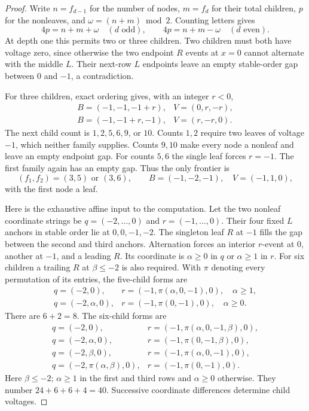 \documentclass[11pt,letterpaper]{article}
\theoremstyle{plain}
\theoremstyle{definition}
\begin{document}
\begin{NoHyper}
\begin{proof}
Write $n=f_{d-1}$ for the number of nodes, $m=f_d$ for their total children,
$p$ for the nonleaves, and $\omega=(n+m)\bmod2$. Counting letters gives
\begin{equation}\label{eq:treecount}
4p=n+m+\omega\quad(d\text{ odd}),\qquad
4p=n+m-\omega\quad(d\text{ even}).
\end{equation}
At depth one this permits two or three children. Two children must both
have voltage zero, since otherwise the two endpoint $R$ events at $x=0$
cannot alternate with the middle $L$. Their next-row $L$ endpoints leave
an empty stable-order gap between $0$ and $-1$, a contradiction.

For three children, exact ordering gives, with an integer $r<0$,
\[
\begin{array}{ll}
 B=(-1,-1,-1+r),&V=(0,r,-r),\\
 B=(-1,-1+r,-1),&V=(r,-r,0).
\end{array}
\]
The next child count is $1,2,5,6,9$, or $10$. Counts $1,2$ require two
leaves of voltage $-1$, which neither family supplies. Counts $9,10$
make every node a nonleaf and leave an empty endpoint gap. For counts
$5,6$ the single leaf forces $r=-1$. The first family again has an empty
gap. Thus the only frontier is
\[
(f_1,f_2)=(3,5)\text{ or }(3,6),\qquad
B=(-1,-2,-1),\quad V=(-1,1,0),
\]
with the first node a leaf.

Here is the exhaustive affine input to the computation. Let the two
nonleaf coordinate strings be $q=(-2,\ldots,0)$ and $r=(-1,\ldots,0)$.
Their four fixed $L$ anchors in stable order lie at $0,0,-1,-2$.
The singleton leaf $R$ at $-1$ fills the gap between the second and third
anchors. Alternation forces an interior $r$-event at $0$, another at
$-1$, and a leading $R$. Its coordinate is $\alpha\ge0$ in $q$ or
$\alpha\ge1$ in $r$. For six children a trailing $R$ at $\beta\le-2$
is also required. With $\pi$ denoting every permutation of its entries,
the five-child forms are
\[
\begin{array}{ll}
q=(-2,0),&
r=(-1,\pi(\alpha,0,-1),0),\quad\alpha\ge1,\\
q=(-2,\alpha,0),&
r=(-1,\pi(0,-1),0),\quad\alpha\ge0.
\end{array}
\]
There are $6+2=8$. The six-child forms are
\[
\begin{array}{ll}
q=(-2,0),&r=(-1,\pi(\alpha,0,-1,\beta),0),\\
q=(-2,\alpha,0),&r=(-1,\pi(0,-1,\beta),0),\\
q=(-2,\beta,0),&r=(-1,\pi(\alpha,0,-1),0),\\
q=(-2,\pi(\alpha,\beta),0),&r=(-1,\pi(0,-1),0).
\end{array}
\]
Here $\beta\le-2$; $\alpha\ge1$ in the first and third rows and
$\alpha\ge0$ otherwise. They number $24+6+6+4=40$.
Successive coordinate differences determine child voltages.


\end{proof}
\end{NoHyper}
\end{document}
